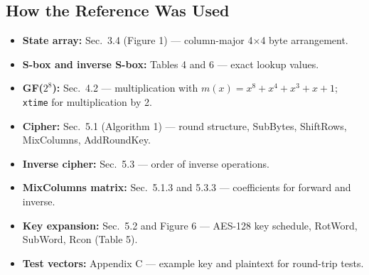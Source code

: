 \documentclass[11pt]{article}
\begin{document}
\subsection*{How the Reference Was Used}

\begin{itemize}
    \item \textbf{State array:} Sec.\ 3.4 (Figure 1) --- column-major 4$\times$4 byte arrangement.
    \item \textbf{S-box and inverse S-box:} Tables 4 and 6 --- exact lookup values.
    \item \textbf{GF($2^8$):} Sec.\ 4.2 --- multiplication with $m(x) = x^8 + x^4 + x^3 + x + 1$; \texttt{xtime} for multiplication by 2.
    \item \textbf{Cipher:} Sec.\ 5.1 (Algorithm 1) --- round structure, SubBytes, ShiftRows, MixColumns, AddRoundKey.
    \item \textbf{Inverse cipher:} Sec.\ 5.3 --- order of inverse operations.
    \item \textbf{MixColumns matrix:} Sec.\ 5.1.3 and 5.3.3 --- coefficients for forward and inverse.
    \item \textbf{Key expansion:} Sec.\ 5.2 and Figure 6 --- AES-128 key schedule, RotWord, SubWord, Rcon (Table 5).
    \item \textbf{Test vectors:} Appendix C --- example key and plaintext for round-trip tests.
\end{itemize}
\end{document}

